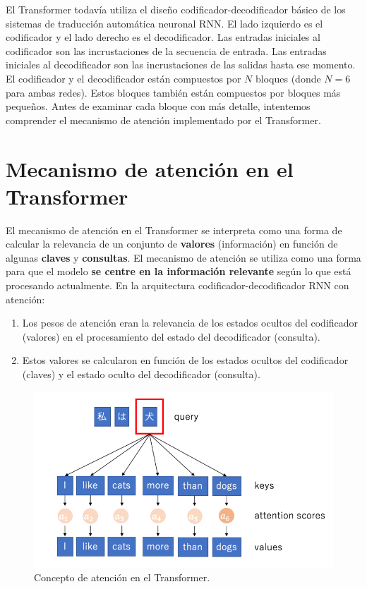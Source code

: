 El Transformer todavía utiliza el diseño codificador-decodificador básico de los sistemas de traducción automática neuronal RNN. El lado izquierdo es el codificador y el lado derecho es el decodificador. Las entradas iniciales al codificador son las incrustaciones de la secuencia de entrada. Las entradas iniciales al decodificador son las incrustaciones de las salidas hasta ese momento. El codificador y el decodificador están compuestos por $N$ bloques (donde $N = 6$ para ambas redes).  Estos bloques también están compuestos por bloques más pequeños. Antes de examinar cada bloque con más detalle, intentemos comprender el mecanismo de atención implementado por el Transformer.

\section{Mecanismo de atención en el Transformer}
El mecanismo de atención en el Transformer se interpreta como una forma de calcular la relevancia de un conjunto de \textbf{valores} (información) en función de algunas \textbf{claves} y \textbf{consultas}. El mecanismo de atención se utiliza como una forma para que el modelo \textbf{se centre en la información relevante} según lo que está procesando actualmente. En la arquitectura codificador-decodificador RNN con atención:
  \begin{enumerate}
    \item Los pesos de atención eran la relevancia de los estados ocultos del codificador (valores) en el procesamiento del estado del decodificador (consulta).
    \item Estos valores se calcularon en función de los estados ocultos del codificador (claves) y el estado oculto del decodificador (consulta).
  \end{enumerate}

\begin{figure}[h]
  \centering
  \includegraphics[scale=0.2]{pics/attention_concept.png}
  \caption{Concepto de atención en el Transformer.}
\end{figure}

